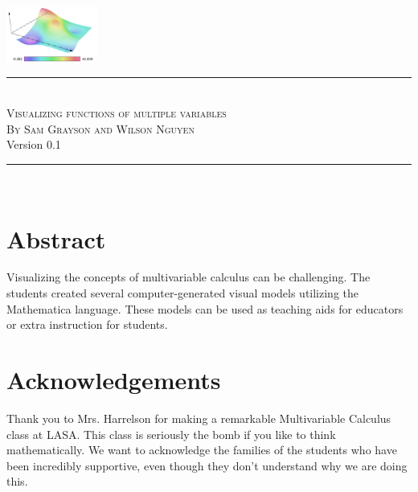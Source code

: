 \documentclass[12pt,letterpaper,english]{article}
\begin{document}
\begin{titlepage}
\thispagestyle{plain}
\begin{center}
\vspace*{\fill}

\includegraphics[width=3cm]{logo.png}~\\[1cm]

\rule{\linewidth}{0.5mm}\\[0.5cm]

\textsc{\LARGE Visualizing functions of multiple variables}\\[1cm]

\textsc{\large By Sam Grayson and Wilson Nguyen}\\[0.7cm]

{\large \isodate Version 0.1} \\[0.7cm]

\rule{\linewidth}{0.5mm}\\[1cm]

\vspace{0.9cm}

\end{center}

\section*{Abstract}

Visualizing the concepts of multivariable calculus can be challenging. The students created several computer-generated visual models utilizing the Mathematica language. These models can be used as teaching aids for educators or extra instruction for students.

\vspace*{\fill}

\end{titlepage}

\section*{Acknowledgements}

Thank you to Mrs. Harrelson for making a remarkable Multivariable Calculus class at LASA. This class is seriously the bomb if you like to think mathematically. We want to acknowledge the families of the students who have been incredibly supportive, even though they don't understand why we are doing this.
\end{document}
